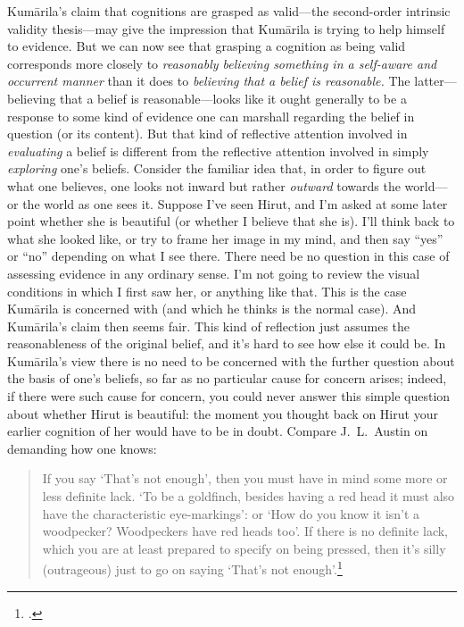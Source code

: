 \documentclass[11pt,letterpaper,oneside]{amsart}
\newenvironment{squote}{\begin{quote}\sf\small}{\rm\end{quote}} %
\newcommand{\kum}{Kum\={a}rila}
\begin{document}







\kum's claim that cognitions are grasped as valid---the second-order intrinsic validity thesis---may give the impression that Kum\=arila is trying to help himself to evidence. But we can now see that grasping a cognition as being valid corresponds more closely to \emph{reasonably believing something in a self-aware and occurrent manner} than it does to \emph{believing that a belief is reasonable.} The latter---believing that a belief is reasonable---looks like it ought generally to be a response to some kind of evidence one can marshall regarding the belief in question (or its content). But that kind of reflective attention involved in \emph{evaluating} a belief is different from the reflective attention involved in simply \emph{exploring} one's beliefs. Consider the familiar idea that, in order to figure out what one believes, one looks not inward but rather \emph{outward} towards the world---or the world as one sees it. Suppose I've seen Hirut, and I'm asked at some later point whether she is beautiful (or whether I believe that she is). I'll think back to what she looked like, or try to frame her image in my mind, and then say ``yes'' or ``no'' depending on what I see there. There need be no question in this case of assessing evidence in any ordinary sense. I'm not going to review the visual conditions in which I first saw her, or anything like that. This is the case Kum\=arila is concerned with (and which he thinks is the normal case). And Kum\=arila's claim then seems fair. This kind of reflection just assumes the reasonableness of the original belief, and it's hard to see how else it could be. In Kum\=arila's view there is no need to be concerned with the further question about the basis of one's beliefs, so far as no particular cause for concern arises; indeed, if there were such cause for concern, you could never answer this simple question about whether Hirut is beautiful: the moment you thought back on Hirut your earlier cognition of her would have to be in doubt. Compare J.~L.~Austin on demanding how one knows:\begin{squote}If you say `That's not enough', then you must have in mind some more or less definite lack. `To be a goldfinch, besides having a red head it must also have the characteristic eye-markings': or `How do you know it isn't a woodpecker? Woodpeckers have red heads too'. If there is no definite lack, which you are at least prepared to specify on being pressed, then it's silly (outrageous) just to go on saying `That's not enough'.\footnote{\citet[p.\ 84]{austin1979other}.}\end{squote}
\end{document}
